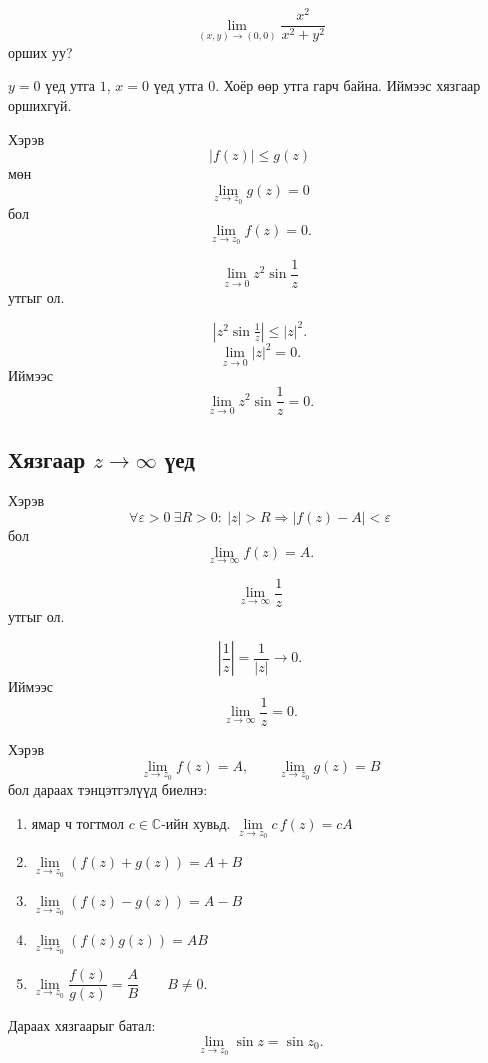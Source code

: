 \begin{exm}
\[
\lim_{(x,y)\to(0,0)} \frac{x^2}{x^2+y^2}
\]
орших уу?
\end{exm}

\begin{sol}
$y=0$ үед утга $1$,
$x=0$ үед утга $0$.
Хоёр өөр утга гарч байна.
Иймээс хязгаар оршихгүй.
\end{sol}

\begin{sen}
Хэрэв
\[
|f(z)|\le g(z)
\]
мөн
\[
\lim_{z\to z_0} g(z)=0
\]
бол
\[
\lim_{z\to z_0} f(z)=0.
\]
\end{sen}

\begin{exm}
\[
\lim_{z\to 0} z^2 \sin \frac{1}{z}
\]
утгыг ол.
\end{exm}

\begin{sol}
\[
|z^2\sin \tfrac{1}{z}| \le |z|^2.
\]
\[
\lim_{z\to 0} |z|^2=0.
\]
Иймээс
\[
\lim_{z\to 0} z^2 \sin \frac{1}{z}=0.
\]
\end{sol}
\subsection*{Хязгаар $z\to\infty$ үед}

\begin{dfn}
Хэрэв
\[
\forall \varepsilon>0\ \exists R>0:\ |z|>R \Rightarrow |f(z)-A|<\varepsilon
\]
бол
\[
\lim_{z\to\infty} f(z)=A.
\]
\end{dfn}

\begin{exm}
\[
\lim_{z\to\infty} \frac{1}{z}
\]
утгыг ол.
\end{exm}

\begin{sol}
\[
\left|\frac{1}{z}\right|=\frac{1}{|z|}\to 0.
\]
Иймээс
\[
\lim_{z\to\infty} \frac{1}{z}=0.
\]
\end{sol}
\begin{thm}
Хэрэв
\[
\lim_{z\to z_0} f(z)=A,\qquad
\lim_{z\to z_0} g(z)=B
\]
бол дараах тэнцэтгэлүүд биелнэ:
\begin{enumerate}
    \item ямар ч тогтмол $c\in\mathbb{C}$-ийн хувьд.
$\lim\limits_{z\to z_0} c\,f(z)=cA$

\item $\lim\limits_{z\to z_0} (f(z)+g(z))=A+B$
\item $\lim\limits_{z\to z_0} (f(z)-g(z))=A-B$
\item$\lim\limits_{z\to z_0} (f(z)g(z))=AB$
\item $\lim\limits_{z\to z_0} \dfrac{f(z)}{g(z)}=\dfrac{A}{B} \qquad B\neq 0.$
\end{enumerate}
\end{thm}
\begin{exm}
Дараах хязгаарыг батал:
\[
\lim_{z\to z_0}\sin z=\sin z_0.
\]
\end{exm}

